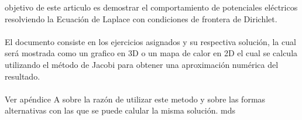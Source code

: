 \documentclass[10pt,journal,compsoc]{IEEEtran}
\begin{document}
%
\IEEEpeerreviewmaketitle







% 
% 
% 
% 
 objetivo de este articulo es demostrar el comportamiento
de potenciales eléctricos resolviendo la Ecuación de Laplace con condiciones de
frontera de Dirichlet.
\\\\
El documento consiste en los ejercicios asignados y su respectiva solución,
la cual será mostrada como un grafico en 3D o un mapa de calor en 2D el cual se
calcula utilizando el método de Jacobi para obtener una aproximación numérica del resultado.
\\\\
Ver apéndice A sobre la razón de utilizar este metodo y sobre las formas alternativas con 
las que se puede calular la misma solución.
\hfill mds
 
\end{document}
